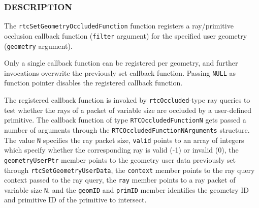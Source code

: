 \begin{Shaded}
\begin{Highlighting}[]

\OperatorTok{\{}
  \OperatorTok{*}\OperatorTok{;}
  \OperatorTok{*}\OperatorTok{;}
   \OperatorTok{;}
  \OperatorTok{*}\OperatorTok{;}
  \OperatorTok{*}\OperatorTok{;}
   \OperatorTok{;}
   \OperatorTok{;}
\OperatorTok{\};}

  \OperatorTok{(*}\OperatorTok{)(}
   \OperatorTok{*}
\OperatorTok{);}

\OperatorTok{(}
\OperatorTok{,}
\OperatorTok{);}
\end{Highlighting}
\end{Shaded}

\subsubsection{DESCRIPTION}\label{description}

The \texttt{rtcSetGeometryOccludedFunction} function registers a
ray/primitive occlusion callback function (\texttt{filter} argument) for
the specified user geometry (\texttt{geometry} argument).

Only a single callback function can be registered per geometry, and
further invocations overwrite the previously set callback function.
Passing \texttt{NULL} as function pointer disables the registered
callback function.

The registered callback function is invoked by \texttt{rtcOccluded}-type
ray queries to test whether the rays of a packet of variable size are
occluded by a user-defined primitive. The callback function of type
\texttt{RTCOccludedFunctionN} gets passed a number of arguments through
the \texttt{RTCOccludedFunctionNArguments} structure. The value
\texttt{N} specifies the ray packet size, \texttt{valid} points to an
array of integers which specify whether the corresponding ray is valid
(-1) or invalid (0), the \texttt{geometryUserPtr} member points to the
geometry user data previously set through
\texttt{rtcSetGeometryUserData}, the \texttt{context} member points to
the ray query context passed to the ray query, the \texttt{ray} member
points to a ray packet of variable size \texttt{N}, and the
\texttt{geomID} and \texttt{primID} member identifies the geometry ID
and primitive ID of the primitive to intersect.

